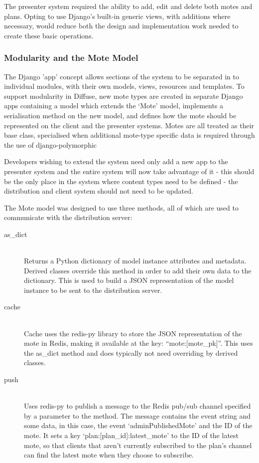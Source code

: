 \documentclass[a4papert,11pt,notitlepage]{ltxdoc}
\begin{document}
The presenter system required the ability to add, edit and delete both motes and plans. Opting to use Django's built-in generic views, with additions where necessary, would reduce both the design and implementation work needed to create these basic operations.

\subsubsection{Modularity and the Mote Model}
The Django 'app' concept allows sections of the system to be separated in to individual modules, with their own models, views, resources and templates. To support modularity in Diffuse, new mote types are created in separate Django apps containing a model which extends the `Mote' model, implements a serialisation method on the new model, and defines how the mote should be represented on the client and the presenter systems. Motes are all treated as their base class, specialised when additional mote-type specific data is required through the use of django-polymorphic\cite{djangopolymorphic:web}

Developers wishing to extend the system need only add a new app to the presenter system and the entire system will now take advantage of it - this should be the only place in the system where content types need to be defined - the distribution and client system should not need to be updated. 

The Mote model was designed to use three methods, all of which are used to communicate with the distribution server:
\begin{description}
\item[as\_dict] \hfill \\
Returns a Python dictionary of model instance attributes and metadata. Derived classes override this method in order to add their own data to the dictionary. This is used to build a JSON representation of the model instance to be sent to the distribution server.
\item[cache] \hfill \\
Cache uses the redis-py\cite{redispy:web} library to store the JSON representation of the mote in Redis, making it available at the key: ``mote:{[}mote\_pk{]}''. This uses the as\_dict method and does typically not need overriding by derived classes.
\item[push] \hfill \\
Uses redis-py to publish a message to the Redis pub/sub channel specified by a parameter to the method. The message contains the event string and some data, in this case, the event `adminPublishedMote' and the ID of the mote. It   sets a key `plan:{[}plan\_id{]}:latest\_mote' to the ID of the latest mote, so that clients that aren't currently subscribed to the plan's channel can find the latest mote when they choose to subscribe.
\end{description}
\end{document}
